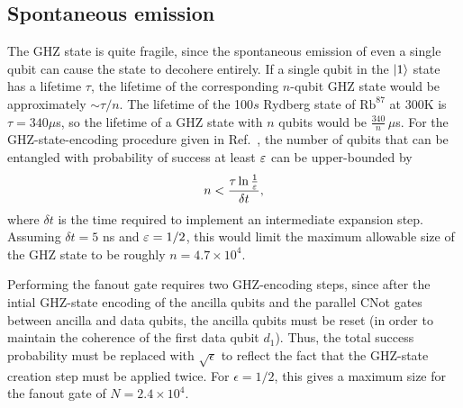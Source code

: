\subsection*{Spontaneous emission}
The GHZ state is quite fragile, since the spontaneous emission of even a single qubit can cause the state to decohere entirely.
If a single qubit in the $\left | 1 \right\rangle$ state has a lifetime $\tau$, the lifetime of the corresponding $n$-qubit GHZ state would be approximately $\sim \tau/n$.
The lifetime of the 100$s$ Rydberg state of $\text{Rb}^{87}$ at 300K is $\tau = 340 \mu$s, so the lifetime of a GHZ state with $n$ qubits would be $\frac{340}n\,\mu$s.
For the GHZ-state-encoding procedure given in Ref.~\cite{Eldredge2017}, the number of qubits that can be entangled with probability of success at least $\varepsilon$ can be upper-bounded by
\begin{align}
  n < \frac{\tau\ln{\frac1{\ensuremath{\varepsilon}}}}{\delta t},
\end{align}
where $\delta t$ is the time required to implement an intermediate expansion step.
Assuming $\delta t = 5$ ns and $\varepsilon = 1/2$,
this would limit the maximum allowable size of the GHZ state to be roughly $n = 4.7\times 10^{4}$.

Performing the fanout gate requires two GHZ-encoding steps, since after the intial GHZ-state encoding of the ancilla qubits and the parallel CNot gates between ancilla and data qubits, the ancilla qubits must be reset (in order to maintain the coherence of the first data qubit $d_1$).
Thus, the total success probability must be replaced with $\sqrt{\epsilon}$ to reflect the fact that the GHZ-state creation step must be applied twice.
For $\epsilon = 1/2$, this gives a maximum size for the fanout gate of $N = 2.4\times 10^{4}$.

